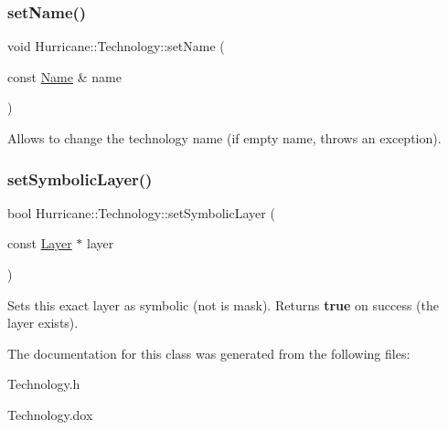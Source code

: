 \subsubsection{\texorpdfstring{set\+Name()}{setName()}}
{\footnotesize\ttfamily void Hurricane\+::\+Technology\+::set\+Name (\begin{DoxyParamCaption}\item[{const \mbox{\hyperlink{classHurricane_1_1Name}{Name}} \&}]{name }\end{DoxyParamCaption})}

Allows to change the technology name (if empty name, throws an exception). \mbox{\label{classHurricane_1_1Technology_a26c12c5828acaeb33068a2899df1134b}} 
\subsubsection{\texorpdfstring{set\+Symbolic\+Layer()}{setSymbolicLayer()}}
{\footnotesize\ttfamily bool Hurricane\+::\+Technology\+::set\+Symbolic\+Layer (\begin{DoxyParamCaption}\item[{const \mbox{\hyperlink{classHurricane_1_1Layer}{Layer}} $\ast$}]{layer }\end{DoxyParamCaption})}

Sets this exact {\ttfamily layer} as symbolic (not is mask). Returns {\bfseries true} on success (the layer exists). 

The documentation for this class was generated from the following files\+:\begin{DoxyCompactItemize}
\item 
Technology.\+h\item 
Technology.\+dox\end{DoxyCompactItemize}
